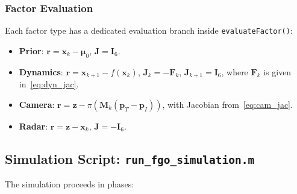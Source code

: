 \documentclass[11pt,a4paper]{article}
\newcommand{\state}{\bm{x}}
\newcommand{\meas}{\bm{z}}
\newcommand{\resid}{\bm{r}}
\newcommand{\jac}{\bm{J}}
\newcommand{\eye}{\bm{I}}
\begin{document}
\subsubsection{Factor Evaluation}

Each factor type has a dedicated evaluation branch inside
\texttt{evaluateFactor()}:

\begin{itemize}[nosep]
  \item \textbf{Prior}: $\resid = \state_k - \bm{\mu}_0$,\;
        $\jac = \eye_6$.
  \item \textbf{Dynamics}: $\resid = \state_{k+1} - f(\state_k)$,\;
        $\jac_k = -\bm{F}_k$,\; $\jac_{k+1} = \eye_6$,
        where $\bm{F}_k$ is given in~\eqref{eq:dyn_jac}.
  \item \textbf{Camera}: $\resid = \meas - \pi(\bm{M}_k(\bm{p}_T -
        \bm{p}_I))$, with Jacobian from~\eqref{eq:cam_jac}.
  \item \textbf{Radar}: $\resid = \meas - \state_k$,\;
        $\jac = -\eye_6$.
\end{itemize}

\subsection{Simulation Script: \texttt{run\_fgo\_simulation.m}}
\label{sec:sim_script}

The simulation proceeds in phases:
\end{document}
